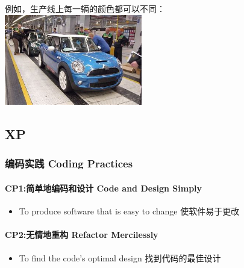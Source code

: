 例如，生产线上每一辆的颜色都可以不同：\\
\includegraphics[width=6cm]{NissanProdLineOIPwJFmfMl7q2_V8JaQi4kQ8QHaE6.jpg}\\

\hypertarget{xp}{%
\subsection{XP}\label{xp}}

\hypertarget{ux7f16ux7801ux5b9eux8df5-coding-practices}{%
\subsubsection{编码实践 Coding
Practices}\label{ux7f16ux7801ux5b9eux8df5-coding-practices}}

\hypertarget{cp1ux7b80ux5355ux5730ux7f16ux7801ux548cux8bbeux8ba1-code-and-design-simply}{%
\paragraph{CP1:简单地编码和设计 Code and Design
Simply}\label{cp1ux7b80ux5355ux5730ux7f16ux7801ux548cux8bbeux8ba1-code-and-design-simply}}

\begin{itemize}
\tightlist
\item
  To produce software that is easy to change 使软件易于更改
\end{itemize}

\hypertarget{cp2ux65e0ux60c5ux5730ux91cdux6784-refactor-mercilessly}{%
\paragraph{CP2:无情地重构 Refactor
Mercilessly}\label{cp2ux65e0ux60c5ux5730ux91cdux6784-refactor-mercilessly}}

\begin{itemize}
\tightlist
\item
  To find the code's optimal design 找到代码的最佳设计
\end{itemize}

